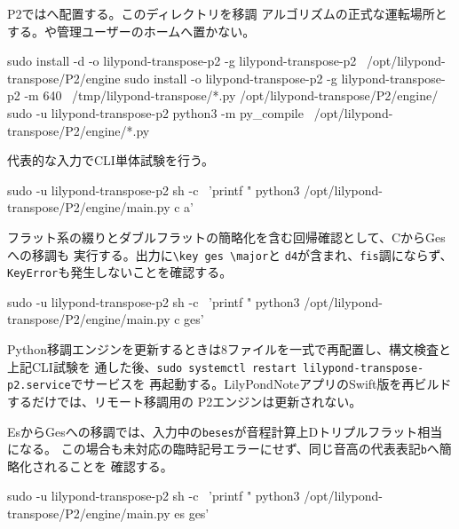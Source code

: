 \documentclass[uplatex,a4paper,11pt]{jsarticle}
\begin{document}
P2ではへ配置する。このディレクトリを移調
アルゴリズムの正式な運転場所とする。や管理ユーザーのホームへ置かない。

\begin{command}
sudo install -d -o lilypond-transpose-p2 -g lilypond-transpose-p2 \
  /opt/lilypond-transpose/P2/engine
sudo install -o lilypond-transpose-p2 -g lilypond-transpose-p2 -m 640 \
  /tmp/lilypond-transpose/*.py /opt/lilypond-transpose/P2/engine/
sudo -u lilypond-transpose-p2 python3 -m py_compile \
  /opt/lilypond-transpose/P2/engine/*.py
\end{command}

代表的な入力でCLI単体試験を行う。

\begin{command}
sudo -u lilypond-transpose-p2 sh -c \
  'printf "%
   python3 /opt/lilypond-transpose/P2/engine/main.py c a'
\end{command}

フラット系の綴りとダブルフラットの簡略化を含む回帰確認として、CからGesへの移調も
実行する。出力に\texttt{\textbackslash key ges \textbackslash major}と
\texttt{d4}が含まれ、\texttt{fis}調にならず、\texttt{KeyError}も発生しないことを確認する。

\begin{command}
sudo -u lilypond-transpose-p2 sh -c \
  'printf "%
   python3 /opt/lilypond-transpose/P2/engine/main.py c ges'
\end{command}

Python移調エンジンを更新するときは8ファイルを一式で再配置し、構文検査と上記CLI試験を
通した後、\texttt{sudo systemctl restart lilypond-transpose-p2.service}でサービスを
再起動する。LilyPondNoteアプリのSwift版を再ビルドするだけでは、リモート移調用の
P2エンジンは更新されない。

EsからGesへの移調では、入力中の\texttt{beses}が音程計算上Dトリプルフラット相当になる。
この場合も未対応の臨時記号エラーにせず、同じ音高の代表表記\texttt{b}へ簡略化されることを
確認する。

\begin{command}
sudo -u lilypond-transpose-p2 sh -c \
  'printf "%
   python3 /opt/lilypond-transpose/P2/engine/main.py es ges'
\end{command}
\end{document}
